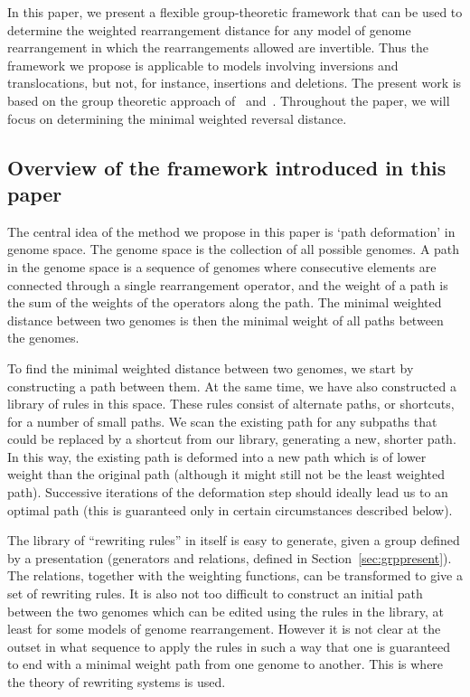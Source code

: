 \documentclass[12pt,a4paper]{amsart}
\numberwithin{equation}{section}
\begin{document}
In this paper, we present a flexible group-theoretic framework that can be used to determine the weighted rearrangement distance for any model of genome rearrangement in which the rearrangements allowed are invertible.  Thus the framework we propose is applicable to models involving inversions and translocations, but not, for instance, insertions and deletions.  The present work is based on the group theoretic approach of~\citet{egrinagy2013group} and~\citet{francis2014algebraic}. Throughout the paper, we will focus on determining the minimal weighted reversal distance.



\subsection*{Overview of the framework introduced in this paper}

The central idea of the method we propose in this paper is `path deformation' in genome space.  The genome space is the collection of all possible genomes. A path in the genome space is a sequence of genomes where consecutive elements are connected through a single rearrangement operator, and the weight of a path is the sum of the weights of the operators along the path. The minimal weighted distance between two genomes is then the minimal weight of all paths between the genomes. 

To find the minimal weighted distance between two genomes, we start by constructing a path between them.  At the same time, we have also constructed a library of rules in this space. These rules consist of alternate paths, or shortcuts, for a number of small paths. We scan the existing path for any subpaths that could be replaced by a shortcut from our library, generating a new, shorter path. In this way, the existing path is deformed into a new path which is of lower weight than the original path (although it might still not be the least weighted path). Successive iterations of the deformation step should ideally lead us to an optimal path (this is guaranteed only in certain circumstances described below).

The library of ``rewriting rules'' in itself is easy to generate, given a group defined by a presentation (generators and relations, defined in Section~\ref{sec:grppresent}).  The relations, together with the weighting functions, can be transformed to give a set of rewriting rules.  It is also not too difficult to construct an initial path between the two genomes which can be edited using the rules in the library, at least for some models of genome rearrangement. However it is not clear at the outset in what sequence to apply the rules in such a way that one is guaranteed to end with a minimal weight path from one genome to another. This is where the theory of rewriting systems is used.  
\end{document}
